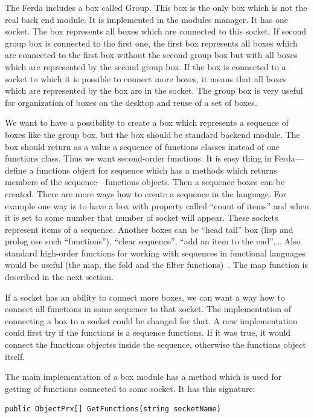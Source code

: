 \documentclass[a4paper,12pt]{book}
\begin{document}
The Ferda includes a box called Group. This box is the only box which is not the real back end module. It is implemented in the modules manager. It has one socket. The box represents all boxes which are connected to this socket. If second group box is connected to the first one, the first box represents all boxes which are connected to the first box without the second group box but with all boxes which are represented by the second group box. If the box is connected to a socket to which it is possible to connect more boxes, it means that all boxes which are represented by the box are in the socket. The group box is very useful for organization of boxes on the desktop and reuse of a set of boxes.

We want to have a possibility to create a box which represents a sequence of boxes like the group box, but the box should be standard backend module. The box should return as a value a sequence of functions classes instead of one functions class. Thus we want second-order functions. It is easy thing in Ferda---define a functions object for sequence which has a methods which returns members of the sequence---functions objects. Then a sequence boxes can be created. There are more ways how to create a sequence in the language. For example one way is to have a box with property called ``count of items'' and when it is set to some number that number of socket will appear. These sockets represent items of a sequence. Another boxes can be ``head tail'' box (lisp and prolog use such ``functions''), ``clear sequence'',  ``add an item to the end'',… Also standard high-order functions for working with sequences in functional languages would be useful (the map, the fold and the filter functions)~\cite{webHighOrderFunctions}. The map function is described in the next section.

If a socket has an ability to connect more boxes, we can want a way how to connect all functions in some sequence to that socket. The implementation of connecting a box to a socket could be changed for that. A new implementation could first try if the functions is a sequence functions. If it was true, it would connect the functions objectss inside the sequence, otherwise the functions object itself.

The main implementation of a box module has a method which is used for getting of functions connected to some socket. It has this signature:
\begin{verbatim}
public ObjectPrx[] GetFunctions(string socketName)
\end{verbatim}
\end{document}
